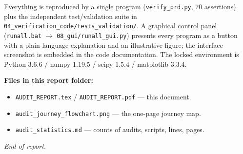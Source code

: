 \documentclass[11pt]{article}
\begin{document}
Everything is reproduced by a single program (\texttt{verify\_prd.py}, 70 assertions) plus
the independent test/validation suite in \texttt{04\_verification\_code/tests\_validation/}.
A graphical control panel (\texttt{runall.bat} $\rightarrow$ \texttt{08\_gui/runall\_gui.py}) presents every
program as a button with a plain-language explanation and an illustrative figure;
the interface screenshot is embedded in the code documentation. The locked
environment is Python 3.6.6 / numpy 1.19.5 / scipy 1.5.4 / matplotlib 3.3.4.

\textbf{Files in this report folder:}
\begin{itemize}
\item \texttt{AUDIT\_REPORT.tex} / \texttt{AUDIT\_REPORT.pdf} --- this document.
\item \texttt{audit\_journey\_flowchart.png} --- the one-page journey map.
\item \texttt{audit\_statistics.md} --- counts of audits, scripts, lines, pages.
\end{itemize}

\emph{End of report.}
\end{document}
